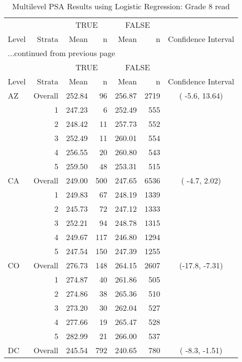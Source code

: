 \begin{longtable}{lrrr@{\extracolsep{.25cm}}rrc}
\caption{Multilevel PSA Results using Logistic Regression: Grade 8 read} \\ 
   \hline & & \multicolumn{2}{c}{TRUE} & \multicolumn{2}{c}{FALSE} & \\ \cline{3-4} \cline{5-6} Level & Strata & Mean & n & Mean & n & Confidence Interval \\ \hline\endfirsthead \multicolumn{7}{l}{{...continued from previous page}}\\ \hline  & & \multicolumn{2}{c}{TRUE} & \multicolumn{2}{c}{FALSE} & \\ \cline{3-4} \cline{5-6} Level & Strata & Mean & n & Mean & n & Confidence Interval \\ \hline \endhead \endfoot \endlastfoot  \hline
AZ & Overall & 252.84 &  96 & 256.87 & 2719 & ( -5.6,  13.64) \\ 
   & 1 & 247.23 &   6 & 252.49 & 555 &  \\ 
   & 2 & 248.42 &  11 & 257.73 & 552 &  \\ 
   & 3 & 252.49 &  11 & 260.01 & 554 &  \\ 
   & 4 & 256.55 &  20 & 260.80 & 543 &  \\ 
   & 5 & 259.50 &  48 & 253.31 & 515 &  \\ 
   \hline
CA & Overall & 249.00 & 500 & 247.65 & 6536 & ( -4.7,   2.02) \\ 
   & 1 & 249.83 &  67 & 248.19 & 1339 &  \\ 
   & 2 & 245.73 &  72 & 247.12 & 1333 &  \\ 
   & 3 & 252.21 &  94 & 248.78 & 1315 &  \\ 
   & 4 & 249.67 & 117 & 246.80 & 1294 &  \\ 
   & 5 & 247.54 & 150 & 247.39 & 1255 &  \\ 
   \hline
CO & Overall & 276.73 & 148 & 264.15 & 2607 & (-17.8,  -7.31) \\ 
   & 1 & 274.87 &  40 & 261.86 & 505 &  \\ 
   & 2 & 274.86 &  38 & 265.36 & 510 &  \\ 
   & 3 & 273.20 &  30 & 262.04 & 527 &  \\ 
   & 4 & 277.66 &  19 & 265.47 & 528 &  \\ 
   & 5 & 282.99 &  21 & 266.00 & 537 &  \\ 
   \hline
DC & Overall & 245.54 & 792 & 240.65 & 780 & ( -8.3,  -1.51) \\ 

\end{longtable}
